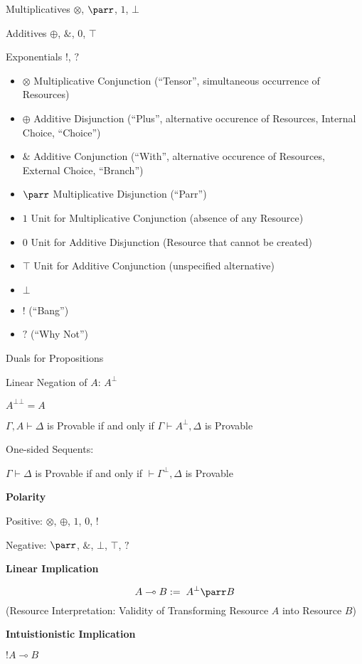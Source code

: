 Multiplicatives $\otimes$, $\parr$, $1$, $\bot$

Additives $\oplus$, $\&$, $0$, $\top$

Exponentials $!$, $?$

\begin{itemize}
  \item $\otimes$ Multiplicative Conjunction (``Tensor'', simultaneous
    occurrence of Resources)
  \item $\oplus$ Additive Disjunction (``Plus'', alternative occurence
    of Resources, Internal Choice, ``Choice'')
  \item $\&$ Additive Conjunction (``With'', alternative occurence of
    Resources, External Choice, ``Branch'')
  \item $\parr$ Multiplicative Disjunction (``Parr'')
  \item $1$ Unit for Multiplicative Conjunction (absence of any
    Resource)
  \item $0$ Unit for Additive Disjunction (Resource that cannot be
    created)
  \item $\top$ Unit for Additive Conjunction (unspecified alternative)
  \item $\bot$
  \item $!$ (``Bang'')
  \item $?$ (``Why Not'')
\end{itemize}

Duals for Propositions %

Linear Negation of $A$: $A^\bot$

$A^{\bot\bot} = A$

\cite{llwiki16}
$\Gamma, A \vdash \Delta$ is Provable if and only if $\Gamma \vdash
A^\bot, \Delta$ is Provable

One-sided Sequents:

$\Gamma \vdash \Delta$ is Provable if and only if $\vdash \Gamma^\bot,
\Delta$ is Provable


\textbf{Polarity}

Positive: $\otimes$, $\oplus$, $1$, $0$, $!$

Negative: $\parr$, $\&$, $\bot$, $\top$, $?$


\textbf{Linear Implication}

\[
  A \multimap B := \; A^{\bot} \parr B
\]
(Resource Interpretation: Validity of Transforming Resource $A$ into
Resource $B$)


\textbf{Intuistionistic Implication}

$!A \multimap B$


